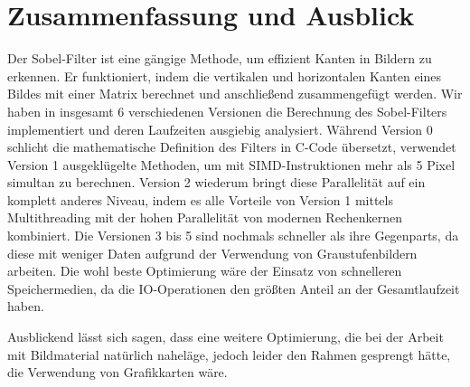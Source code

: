 \documentclass[course=erap]{aspdoc}
\begin{document}
\section{Zusammenfassung und Ausblick}
\label{sec:zusammenfassung}
Der Sobel-Filter ist eine gängige Methode, um effizient Kanten in Bildern zu erkennen.
Er funktioniert, indem die vertikalen und horizontalen Kanten eines Bildes mit einer Matrix berechnet und anschließend zusammengefügt werden.
Wir haben in insgesamt 6 verschiedenen Versionen die Berechnung des Sobel-Filters implementiert und deren Laufzeiten ausgiebig analysiert.
Während Version 0 schlicht die mathematische Definition des Filters in C-Code übersetzt, verwendet Version 1 ausgeklügelte Methoden, um mit SIMD-Instruktionen mehr als 5 Pixel simultan zu berechnen.
Version 2 wiederum bringt diese Parallelität auf ein komplett anderes Niveau, indem es alle Vorteile von Version 1 mittels Multithreading mit der hohen Parallelität von modernen Rechenkernen kombiniert.
Die Versionen 3 bis 5 sind nochmals schneller als ihre Gegenparts, da diese mit weniger Daten aufgrund der Verwendung von Graustufenbildern arbeiten.
Die wohl beste Optimierung wäre der Einsatz von schnelleren Speichermedien, da die IO-Operationen den größten Anteil an der Gesamtlaufzeit haben.

Ausblickend lässt sich sagen, dass eine weitere Optimierung, die bei der Arbeit mit Bildmaterial natürlich naheläge, jedoch leider den Rahmen gesprengt hätte, die Verwendung von Grafikkarten wäre.



\end{document}
